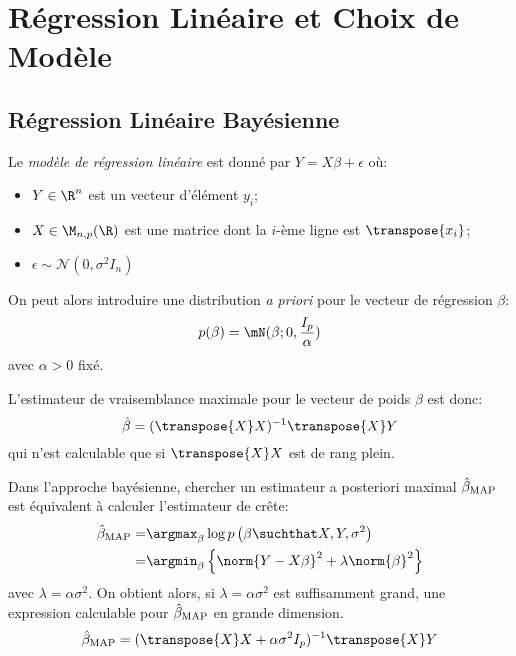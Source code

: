 \documentclass[info, math, french]{mpb-cours}
\def\model#1#2{p\left(#1\suchthat#2\right)}
\def\define#1{\emph{\textcolor{vulm}{#1}}}
\begin{document}
\section{Régression Linéaire et Choix de Modèle}
\subsection{Régression Linéaire Bayésienne}
\begin{definition}
	Le \define{modèle de régression linéaire} est donné par $Y = X\beta + \epsilon$ où:
	\begin{itemize}
		\item $Y \in \R^{n}$ est un vecteur d'élément $y_i$;
		\item $X \in \M_{n, p}(\R)$ est une matrice dont la $i$-ème ligne est $\transpose{x_{i}}$;
		\item $\epsilon \sim \mathcal{N}(0, \sigma^{2}I_{n})$
	\end{itemize}
\end{definition}

On peut alors introduire une distribution \emph{a priori} pour le vecteur de régression $\beta$:
\begin{equation*}
	p(\beta) = \mN(\beta; 0, \frac{I_{p}}{\alpha})
\end{equation*}
avec $\alpha > 0$ fixé.

L'estimateur de vraisemblance maximale pour le vecteur de poids $\beta$ est donc:
\begin{equation*}
	\hat{\beta} = (\transpose{X}X)^{-1}\transpose{X}Y
\end{equation*}
qui n'est calculable que si $\transpose{X}X$ est de rang plein.

\begin{proposition}
	Dans l'approche bayésienne, chercher un estimateur a posteriori maximal $\hat{\beta}_{\rm MAP}$ est
	équivalent à calculer l'estimateur de crête:
	\begin{align*}
		\hat{\beta}_{\rm MAP} = & \argmax_{\beta}\log \model{\beta}{X, Y, \sigma^{2}}                             \\
		=                       & \argmin_{\beta} \left\{\norm{Y - X\beta}^{2} + \lambda \norm{\beta}^{2}\right\}
	\end{align*}
	avec $\lambda = \alpha\sigma^{2}$.
	On obtient alors, si $\lambda = \alpha\sigma^{2}$ est suffisamment grand, une expression calculable pour $\hat{\beta}_{\rm MAP}$ en grande dimension.
	\begin{equation*}
		\hat{\beta}_{\rm MAP} = (\transpose{X}X + \alpha\sigma^{2}I_{p})^{-1}\transpose{X}Y
	\end{equation*}
\end{proposition}
\end{document}
